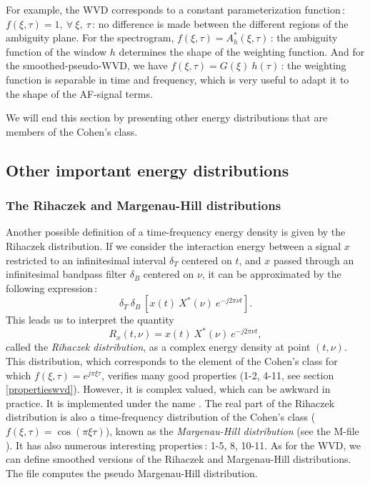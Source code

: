   For example, the WVD corresponds to a constant parameterization
function\,: $f(\xi,\tau)=1,\ \forall\ \xi,\ \tau$\,: no difference is made
between the different regions of the ambiguity plane. For the spectrogram,
$f(\xi,\tau)=A_h^*(\xi,\tau)$\,: the ambiguity function of the window $h$
determines the shape of the weighting function. And for the
smoothed-pseudo-WVD, we have $f(\xi,\tau)=G(\xi)\ h(\tau)$\,: the weighting
function is separable in time and frequency, which is very useful to adapt
it to the shape of the AF-signal terms.

  We will end this section by presenting other energy distributions that
are members of the Cohen's class.


\subsection{Other important energy distributions}
\subsubsection{The Rihaczek and Margenau-Hill distributions}\label{MHD}
 Another
  possible definition of a time-frequency energy density is given by the
  Rihaczek distribution. If we consider the interaction energy between a
  signal $x$ restricted to an infinitesimal interval $\delta_T$ centered on
  $t$, and $x$ passed through an infinitesimal bandpass filter $\delta_B$
  centered on $\nu$, it can be approximated by the following expression\,:
\[\delta_T\ \delta_B\ [x(t)\ X^*(\nu)\ e^{-j2\pi \nu t}].\]
This leads us to interpret the quantity
\[R_x(t,\nu)=x(t)\ X^*(\nu)\ e^{-j2\pi \nu t},\]
called the {\it Rihaczek distribution}, as a complex energy density at
point $(t,\nu)$.  This distribution, which corresponds to the element of
the Cohen's class for which $f(\xi,\tau)=e^{j\pi \xi \tau}$, verifies many
good properties (1-2, 4-11, see section \ref{propertieswvd}). However, it
is complex valued, which can be awkward in practice. It is implemented
under the name . The real part of
the Rihaczek distribution is also a time-frequency distribution of the
Cohen's class ($f(\xi,\tau)=\cos{(\pi \xi \tau)}$), known as the {\it
Margenau-Hill distribution} (see the M-file ). It has also numerous interesting properties\,:
1-5, 8, 10-11. As for the WVD, we can define smoothed versions of the
Rihaczek and Margenau-Hill distributions. The file  computes the pseudo Margenau-Hill distribution.

